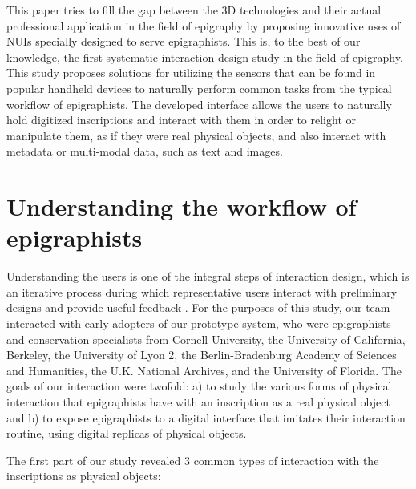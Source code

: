 \documentclass[amsthm,ebook]{saparticle}
\begin{document}
This paper tries to fill the gap between the 3D technologies and their actual professional application in the field of
epigraphy by proposing innovative uses of NUIs specially designed to serve epigraphists. This is, to the best of our
knowledge, the first systematic interaction design study in the field of epigraphy. This study proposes solutions for
utilizing the sensors that can be found in popular handheld devices to naturally perform common tasks from the typical
workflow of epigraphists. The developed interface allows the users to naturally hold digitized inscriptions and
interact with them in order to relight or manipulate them, as if they were real physical objects, and also interact
with metadata or multi-modal data, such as text and images. 

\section{Understanding the workflow of epigraphists}


Understanding the users is one of the integral steps of interaction design, which is an iterative process during which
representative users interact with preliminary designs and provide useful feedback \citep{preece_interaction_2015}. For the
purposes of this study, our team interacted with early adopters of our prototype system, who were epigraphists and
conservation specialists from Cornell University, the University of California, Berkeley, the University of Lyon 2, the
Berlin-Bradenburg Academy of Sciences and Humanities, the U.K. National Archives, and the University of Florida. The
goals of our interaction were twofold: a) to study the various forms of physical interaction that epigraphists have
with an inscription as a real physical object and b) to expose epigraphists to a digital interface that imitates
their interaction routine, using digital replicas of physical objects.

The first part of our study revealed 3 common types of interaction with the inscriptions as physical objects:
\end{document}

